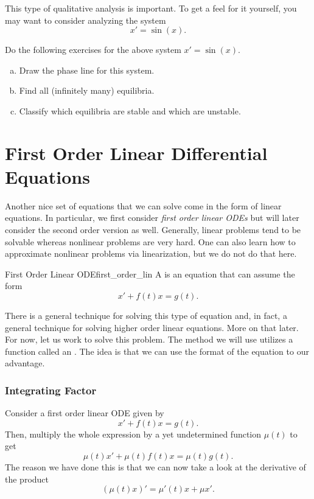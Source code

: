                 This type of qualitative analysis is important.  To get a feel for it yourself, you may want to consider analyzing the system
                \[
                x' = \sin(x).
                \]
                \begin{exercise} Do the following exercises for the above system $x'=\sin(x)$.
                \begin{enumerate}[(a)]
                    \item Draw the phase line for this system.
                    \item Find all (infinitely many) equilibria.
                    \item Classify which equilibria are stable and which are unstable.
                \end{enumerate}
                \end{exercise}


        \section{First Order Linear Differential Equations}

        Another nice set of equations that we can solve come in the form of linear equations.  In particular, we first consider \emph{first order linear ODEs} but will later consider the second order version as well.  Generally, linear problems tend to be solvable whereas nonlinear problems are very hard.  One can also learn how to approximate nonlinear problems via linearization, but we do not do that here.

        \begin{df}{First Order Linear ODE}{first_order_lin}
            A  is an equation that can assume the form
            \[
            x'+f(t)x=g(t).
            \]
        \end{df}

        There is a general technique for solving this type of equation and, in fact, a general technique for solving higher order linear equations.  More on that later.  For now, let us work to solve this problem.  The method we will use utilizes a function called an . The idea is that we can use the format of the equation to our advantage.

        \subsubsection{Integrating Factor}
        Consider a first order linear ODE given by
        \[
        x'+f(t)x=g(t).
        \]
        Then, multiply the whole expression by a yet undetermined function $\mu(t)$ to get
        \begin{equation}
        \mu(t)x'+\mu(t)f(t)x=\mu(t)g(t). \label{eq:int_fact_1}
        \end{equation}
        The reason we have done this is that we can now take a look at the derivative of the product
        \begin{equation}
        \left( \mu(t)x\right)'= \mu'(t)x+\mu x'. \label{eq:int_fact_2}
        \end{equation}

